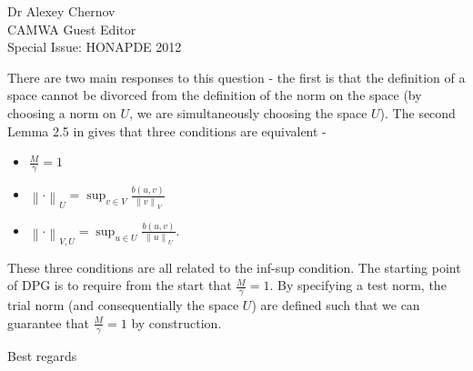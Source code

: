\documentclass{letter}
\newcommand{\nor}[1]{\left\| #1 \right\|}
\begin{document}
\begin{letter}{Dr Alexey Chernov\\CAMWA Guest Editor\\Special Issue: HONAPDE 2012}
\begin{enumerate}
\begin{enumerate}
\begin{enumerate}
\end{enumerate}
There are two main responses to this question - the first is that the definition of a space cannot be divorced from the definition of the norm on the space (by choosing a norm on $U$, we are simultaneously choosing the space $U$).  The second Lemma 2.5 in \cite{Bui-ThanhDemkowiczGhattas11a} gives that three conditions are equivalent - 
\begin{itemize}
\item $\frac{M}{\gamma} = 1$
\item $\nor{\cdot}_U = \sup_{v\in V}\frac{b(u,v)}{\nor{v}_V}$
\item $\nor{\cdot}_{V,U} = \sup_{u\in U}\frac{b(u,v)}{\nor{u}_U}$.
\end{itemize}
These three conditions are all related to the inf-sup condition.  The starting point of DPG is to require from the start that $\frac{M}{\gamma} = 1$.  By specifying a test norm, the trial norm  (and consequentially the space $U$) are defined such that we can guarantee that $\frac{M}{\gamma} = 1$ by construction.  

\end{enumerate}
\end{enumerate}
\closing{Best regards}




\end{letter}
\end{document}
